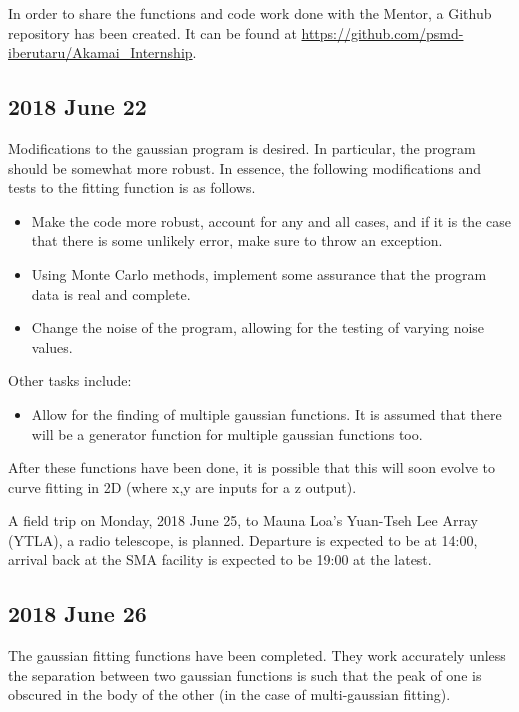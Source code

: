 \documentclass[twocolumn]{article}
\begin{document}
In order to share the functions and code work done with the Mentor, a Github repository has been created. It can be found at \url{https://github.com/psmd-iberutaru/Akamai_Internship}.

\subsection{2018 June 22}
\label{subsec:2018_June_22}

\begin{meetingnotes*}
	Modifications to the gaussian program is desired. In particular, the program should be somewhat more robust. In essence, the following modifications and tests to the fitting function is as follows.

	\begin{itemize}
		\item Make the code more robust, account for any and all cases, and if it is the case that there is some unlikely error, make sure to throw an exception.
		\item Using Monte Carlo methods, implement some assurance that the program data is real and complete.
		\item Change the noise of the program, allowing for the testing of varying noise values.
	\end{itemize}


	Other tasks include:
	\begin{itemize}
		\item Allow for the finding of multiple gaussian functions. It is assumed that there will be a generator function for multiple gaussian functions too.
	\end{itemize}
	After these functions have been done, it is possible that this will soon evolve to curve fitting in 2D (where x,y are inputs for a z output).
\end{meetingnotes*}

A field trip on Monday, 2018 June 25, to Mauna Loa's Yuan-Tseh Lee Array (YTLA), a radio telescope, is planned. Departure is expected to be at 14:00, arrival back at the SMA facility is expected to be 19:00 at the latest. 


\subsection{2018 June 26}
\label{2018_June_26}
The gaussian fitting functions have been completed. They work accurately unless the separation between two gaussian functions is such that the peak of one is obscured in the body of the other (in the case of multi-gaussian fitting). 
\end{document}
